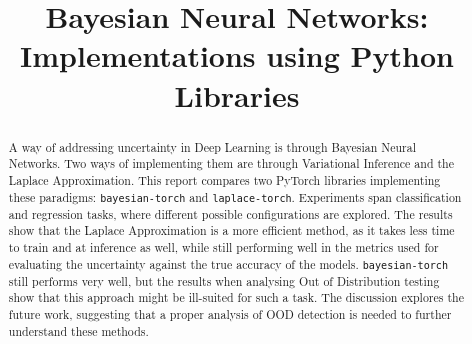 \documentclass[conference]{IEEEtran}
\begin{document}


%
\title{Bayesian Neural Networks:\\[4pt] Implementations using Python Libraries}


\author{
	}





\maketitle

\begin{abstract}
    A way of addressing uncertainty in Deep Learning is through Bayesian Neural Networks. Two ways
    of implementing them are through Variational Inference and the Laplace Approximation. This report
    compares two PyTorch libraries implementing these paradigms: \texttt{bayesian-torch} and
    \texttt{laplace-torch}. Experiments span classification and regression tasks, where different possible
    configurations are explored. The results show that the Laplace Approximation is a more efficient method,
    as it takes less time to train and at inference as well, while still performing well in the metrics used
    for evaluating the uncertainty against the true accuracy of the models. \texttt{bayesian-torch} still performs
    very well, but the results when analysing Out of Distribution testing show that this approach might be
    ill-suited for such a task. The discussion explores the future work, suggesting that a proper analysis of OOD
    detection is needed to further understand these methods.
\end{abstract}
\end{document}
